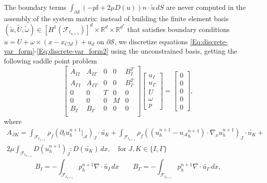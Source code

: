 \documentclass[graybox]{svmult}
\newcommand{\Fluid}{\mathcal{F}} %
\newcommand{\Alemap}{\mathcal{A}} %
\newcommand{\Vel}{u} %
\newcommand{\Pres}{p} %
\newcommand{\tvel}{U} %
\newcommand{\angvel}{\omega} %
\newcommand{\Solid}{\mathcal{S}} %
\newcommand{\normal}{n} %
\newcommand{\CompDomain}{\Fluid}
\begin{document}
The boundary terms $	\int_{\partial \Solid} (-\Pres\mathbb{I} + 2\mu D(\Vel)) \normal \cdot\tilde{\Vel}\, dS $ are never computed in the assembly of the system matrix: 
instead of building the finite element basis $(\tilde{\Vel},\tilde{\tvel},\tilde{\angvel}) \in [H^1(\CompDomain_{t_{n+1}})]^d \times \mathbb{R}^d \times \mathbb{R}^{d^*}$ that satisfies boundary conditions $\Vel = \tvel+ \angvel \times (x-x_{CM}) + u_d$ on  $\partial \Solid$, we discretize equations \eqref{Eq:discrete-var_form}-\eqref{Eq:discrete-var_form2} using the unconstrained basis, getting the following saddle point problem
\begin{equation}
	\begin{bmatrix}
		A_{II} & A_{I\Gamma} & 0 & 0 & B_{I}^T  \\
		A_{\Gamma I} & A_{\Gamma \Gamma}  & 0 & 0 & B_{\Gamma}^T\\
		0 & 0 & T
		& 0 & 0 \\
		0 & 0 & 0& M
		& 0\\
		B_I & B_\Gamma & 0 & 0 & 0   \\
	\end{bmatrix}
	\begin{bmatrix}
		\Vel_I \\ \Vel_\Gamma \\ \tvel \\ \angvel \\ \Pres 
	\end{bmatrix} 
	= 
	\begin{bmatrix}
		0 \\
		0\\
		0
		\\
		0
		\\
		0
	\end{bmatrix},
	\label{Eq:flu-rig-block}
\end{equation} 
where
\begin{multline*}
	A_{JK} =	\int_{\CompDomain_{t_{n+1}}} \rho_f(\partial_t u_h^{n+1}|_\Alemap )_J \cdot \tilde{\Vel_K} + \int_{\CompDomain_{t_{n+1}}}\rho_f ((\Vel_h^{n+1}-{\Vel_{\mathcal{A}}}_h^{n+1} )\cdot \nabla_x u_h^{n+1})_J \cdot \tilde{\Vel_K} + \\
	2\mu\int_{\CompDomain_{t_{n+1}}} D(\Vel_h^{n+1})_J	: D(\tilde{\Vel_K}) \, dx, \quad \text{for $J,K \in \{I,\Gamma\}$} 
\end{multline*}
\begin{equation*}
	B_I = -\int_{{\CompDomain_{t_{n+1}}} } \Pres_{h}^{n+1} \nabla\cdot \tilde{\Vel_I} \, dx \qquad  B_\Gamma =  -\int_{{\CompDomain_{t_{n+1}}} } \Pres_{h}^{n+1} \nabla\cdot \tilde{\Vel_\Gamma} \, dx,
\end{equation*}
\end{document}
